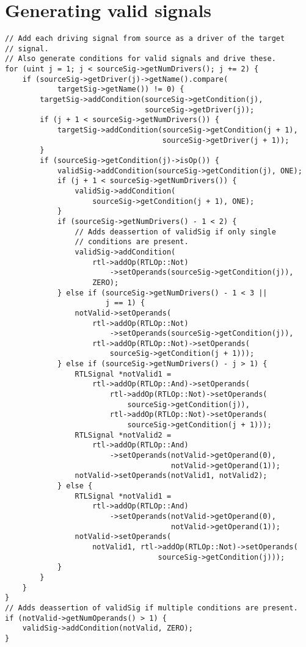 \section{\label{sec:validsinglssourcecode}Generating valid signals}
\lstset{language=C++,style=Cstyle}
\begin{lstlisting}
// Add each driving signal from source as a driver of the target
// signal.
// Also generate conditions for valid signals and drive these.
for (uint j = 1; j < sourceSig->getNumDrivers(); j += 2) {
    if (sourceSig->getDriver(j)->getName().compare(
            targetSig->getName()) != 0) {
        targetSig->addCondition(sourceSig->getCondition(j),
                                sourceSig->getDriver(j));
        if (j + 1 < sourceSig->getNumDrivers()) {
            targetSig->addCondition(sourceSig->getCondition(j + 1),
                                    sourceSig->getDriver(j + 1));
        }
        if (sourceSig->getCondition(j)->isOp()) {
            validSig->addCondition(sourceSig->getCondition(j), ONE);
            if (j + 1 < sourceSig->getNumDrivers()) {
                validSig->addCondition(
                    sourceSig->getCondition(j + 1), ONE);
            }
            if (sourceSig->getNumDrivers() - 1 < 2) {
                // Adds deassertion of validSig if only single
                // conditions are present.
                validSig->addCondition(
                    rtl->addOp(RTLOp::Not)
                        ->setOperands(sourceSig->getCondition(j)),
                    ZERO);
            } else if (sourceSig->getNumDrivers() - 1 < 3 ||
                       j == 1) {
                notValid->setOperands(
                    rtl->addOp(RTLOp::Not)
                        ->setOperands(sourceSig->getCondition(j)),
                    rtl->addOp(RTLOp::Not)->setOperands(
                        sourceSig->getCondition(j + 1)));
            } else if (sourceSig->getNumDrivers() - j > 1) {
                RTLSignal *notValid1 =
                    rtl->addOp(RTLOp::And)->setOperands(
                        rtl->addOp(RTLOp::Not)->setOperands(
                            sourceSig->getCondition(j)),
                        rtl->addOp(RTLOp::Not)->setOperands(
                            sourceSig->getCondition(j + 1)));
                RTLSignal *notValid2 =
                    rtl->addOp(RTLOp::And)
                        ->setOperands(notValid->getOperand(0),
                                      notValid->getOperand(1));
                notValid->setOperands(notValid1, notValid2);
            } else {
                RTLSignal *notValid1 =
                    rtl->addOp(RTLOp::And)
                        ->setOperands(notValid->getOperand(0),
                                      notValid->getOperand(1));
                notValid->setOperands(
                    notValid1, rtl->addOp(RTLOp::Not)->setOperands(
                                   sourceSig->getCondition(j)));
            }
        }
    }
}
// Adds deassertion of validSig if multiple conditions are present.
if (notValid->getNumOperands() > 1) {
    validSig->addCondition(notValid, ZERO);
}
\end{lstlisting}
\clearpage
